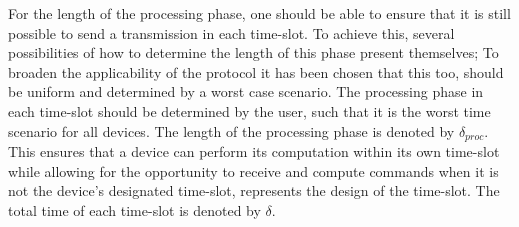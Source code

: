 \bigskip \noindent
For the length of the processing phase, one should be able to ensure that it is still possible to send a transmission in each time-slot.
To achieve this, several possibilities of how to determine the length of this phase present themselves; To broaden the applicability of the protocol it has been chosen that this too, should be uniform and determined by a worst case scenario.
The processing phase in each time-slot should be determined by the user, such that it is the worst time scenario for all devices.
The length of the processing phase is denoted by $\delta_{proc}$.
This ensures that a device can perform its computation within its own time-slot while allowing for the opportunity to receive and compute commands when it is not the device's designated time-slot,  represents the design of the time-slot.
The total time of each time-slot is denoted by $\delta$.

